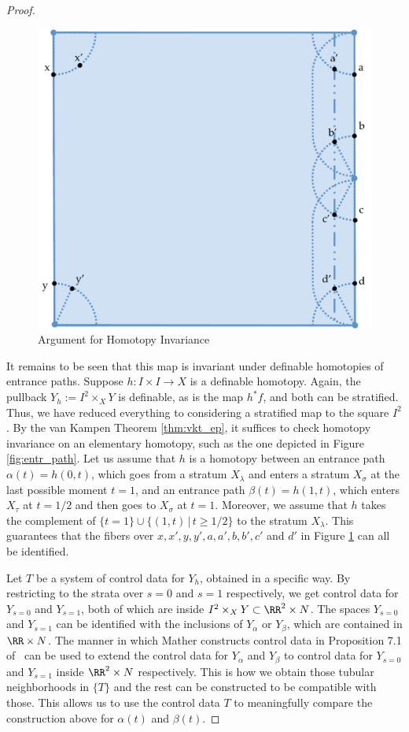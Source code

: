 \begin{proof}
	\begin{figure}
		\centering
		\includegraphics[width=.8\textwidth]{strat_maps_htpy.pdf}
		\caption{Argument for Homotopy Invariance}
		\label{fig:strat_maps_htpy}
	\end{figure}
	
	It remains to be seen that this map is invariant under definable homotopies of entrance paths. Suppose $h:I\times I\to X$ is a definable homotopy. Again, the pullback $Y_h:=I^2\times_X Y$ is definable, as is the map $h^*f$, and both can be stratified. Thus, we have reduced everything to considering a stratified map to the square $I^2$. By the van Kampen Theorem \ref{thm:vkt_ep}, it suffices to check homotopy invariance on an elementary homotopy, such as the one depicted in Figure \ref{fig:entr_path}. Let us assume that $h$ is a homotopy between an entrance path $\alpha(t)=h(0,t)$, which goes from a stratum $X_{\lambda}$ and enters a stratum $X_{\sigma}$ at the last possible moment $t=1$, and an entrance path $\beta(t)=h(1,t)$, which enters $X_{\tau}$ at $t=1/2$ and then goes to $X_{\sigma}$ at $t=1$. Moreover, we assume that $h$ takes the complement of $\{t=1\}\cup \{(1,t)\,|\, t\geq 1/2\}$ to the stratum $X_{\lambda}$. This guarantees that the fibers over $x,x',y,y',a,a',b,b',c'$ and $d'$ in Figure \ref{fig:strat_maps_htpy} can all be identified.

Let ${T}$ be a system of control data for $Y_h$, obtained in a specific way. By restricting to the strata over $s=0$ and $s=1$ respectively, we get control data for $Y_{s=0}$ and $Y_{s=1}$, both of which are inside $I^2\times_X Y\subset \RR^2\times N$. The spaces $Y_{s=0}$ and $Y_{s=1}$ can be identified with the inclusions of $Y_{\alpha}$ or $Y_{\beta}$, which are contained in $\RR\times N$. The manner in which Mather constructs control data in Proposition 7.1 of~\cite{mather} can be used to extend the control data for $Y_{\alpha}$ and $Y_{\beta}$ to control data for $Y_{s=0}$ and $Y_{s=1}$ inside $\RR^2\times N$ respectively. This is how we obtain those tubular neighborhoods in $\{T\}$ and the rest can be constructed to be compatible with those. This allows us to use the control data ${T}$ to meaningfully compare the construction above for $\alpha(t)$ and $\beta(t)$.
 	

\end{proof}
